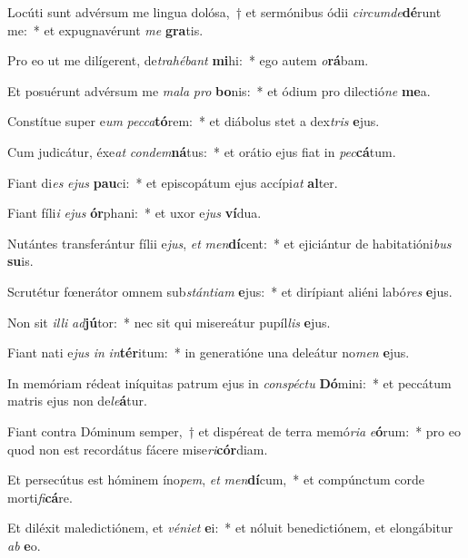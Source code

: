 \item Locúti sunt advérsum me lingua dolósa,~† et sermónibus ódii \textit{cir}\textit{cum}\textit{de}\textbf{dé}runt me:~* et expugnavérunt \textit{me} \textbf{gra}tis.
\item Pro eo ut me dilígerent, de\textit{tra}\textit{hé}\textit{bant} \textbf{mi}hi:~* ego autem \textit{o}\textbf{rá}bam.
\item Et posuérunt advérsum me \textit{ma}\textit{la} \textit{pro} \textbf{bo}nis:~* et ódium pro dilectió\textit{ne} \textbf{me}a.
\item Constítue super e\textit{um} \textit{pec}\textit{ca}\textbf{tó}rem:~* et diábolus stet a dex\textit{tris} \textbf{e}jus.
\item Cum judicátur, éxe\textit{at} \textit{con}\textit{dem}\textbf{ná}tus:~* et orátio ejus fiat in \textit{pec}\textbf{cá}tum.
\item Fiant di\textit{es} \textit{e}\textit{jus} \textbf{pau}ci:~* et episcopátum ejus accípi\textit{at} \textbf{al}ter.
\item Fiant fíli\textit{i} \textit{e}\textit{jus} \textbf{ór}phani:~* et uxor e\textit{jus} \textbf{ví}dua.
\item Nutántes transferántur fílii e\textit{jus}, \textit{et} \textit{men}\textbf{dí}cent:~* et ejiciántur de habitatióni\textit{bus} \textbf{su}is.
\item Scrutétur fœnerátor omnem sub\textit{stán}\textit{ti}\textit{am} \textbf{e}jus:~* et dirípiant aliéni labó\textit{res} \textbf{e}jus.
\item Non sit \textit{il}\textit{li} \textit{ad}\textbf{jú}tor:~* nec sit qui misereátur pupíl\textit{lis} \textbf{e}jus.
\item Fiant nati e\textit{jus} \textit{in} \textit{in}\textbf{tér}itum:~* in generatióne una deleátur no\textit{men} \textbf{e}jus.
\item In memóriam rédeat iníquitas patrum ejus in \textit{con}\textit{spéc}\textit{tu} \textbf{Dó}mini:~* et peccátum matris ejus non de\textit{le}\textbf{á}tur.
\item Fiant contra Dóminum semper,~† et dispéreat de terra memó\textit{ri}\textit{a} \textit{e}\textbf{ó}rum:~* pro eo quod non est recordátus fácere mise\textit{ri}\textbf{cór}diam.
\item Et persecútus est hóminem íno\textit{pem}, \textit{et} \textit{men}\textbf{dí}cum,~* et compúnctum corde morti\textit{fi}\textbf{cá}re.
\item Et diléxit maledictiónem, et \textit{vé}\textit{ni}\textit{et} \textbf{e}i:~* et nóluit benedictiónem, et elongábitur \textit{ab} \textbf{e}o.
